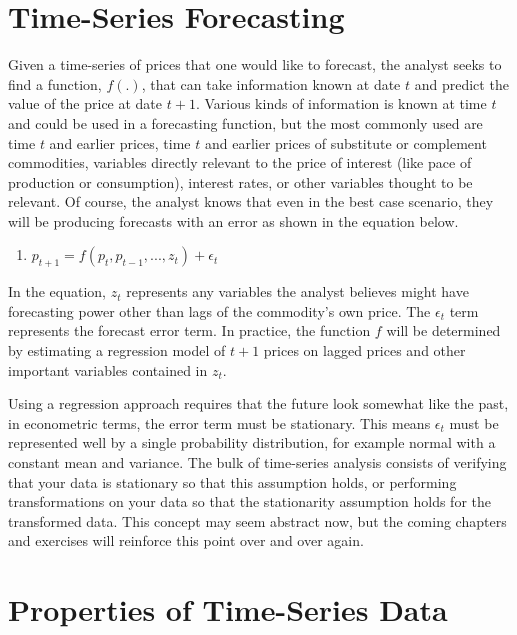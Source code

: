 \documentclass[
]{book}
\providecommand{\tightlist}{%
  \setlength{\itemsep}{0pt}\setlength{\parskip}{0pt}}
\begin{document}
\hypertarget{time-series-forecasting}{%
\section{Time-Series Forecasting}\label{time-series-forecasting}}

Given a time-series of prices that one would like to forecast, the analyst seeks to find a function, \(f(.)\), that can take information known at date \(t\) and predict the value of the price at date \(t+1\). Various kinds of information is known at time \(t\) and could be used in a forecasting function, but the most commonly used are time \(t\) and earlier prices, time \(t\) and earlier prices of substitute or complement commodities, variables directly relevant to the price of interest (like pace of production or consumption), interest rates, or other variables thought to be relevant. Of course, the analyst knows that even in the best case scenario, they will be producing forecasts with an error as shown in the equation below.

\begin{enumerate}
\def\labelenumi{(\arabic{enumi})}
\tightlist
\item
  \(p_{t+1} = f(p_t, p_{t-1}, ..., z_t) + \epsilon_t\)
\end{enumerate}

In the equation, \(z_t\) represents any variables the analyst believes might have forecasting power other than lags of the commodity's own price. The \(\epsilon_t\) term represents the forecast error term. In practice, the function \(f\) will be determined by estimating a regression model of \(t+1\) prices on lagged prices and other important variables contained in \(z_t\).

Using a regression approach requires that the future look somewhat like the past, in econometric terms, the error term must be stationary. This means \(\epsilon_t\) must be represented well by a single probability distribution, for example normal with a constant mean and variance. The bulk of time-series analysis consists of verifying that your data is stationary so that this assumption holds, or performing transformations on your data so that the stationarity assumption holds for the transformed data. This concept may seem abstract now, but the coming chapters and exercises will reinforce this point over and over again.

\hypertarget{properties-of-time-series-data}{%
\section{Properties of Time-Series Data}\label{properties-of-time-series-data}}
\end{document}
